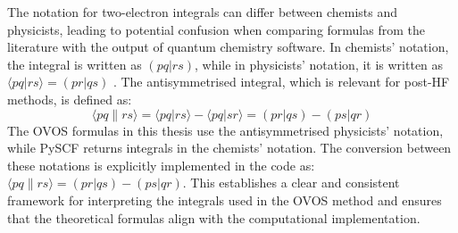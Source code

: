 The notation for two-electron integrals can differ between chemists and physicists, leading to potential confusion when comparing formulas from the literature with the output of quantum chemistry software. In chemists' notation, the integral is written as $(pq|rs)$, while in physicists' notation, it is written as $\langle pq | rs \rangle = (pr|qs)$ \cite{Helgaker2000}. The antisymmetrised integral, which is relevant for post-HF methods, is defined as:
\begin{equation*}
    \langle pq \| rs \rangle = \langle pq | rs \rangle - \langle pq | sr \rangle = (pr|qs) - (ps|qr)
\end{equation*}
The OVOS formulas in this thesis use the antisymmetrised physicists' notation, while PySCF returns integrals in the chemists' notation\cite{Sun2020}. The conversion between these notations is explicitly implemented in the code as: $\langle pq \| rs \rangle = (pr|qs) - (ps|qr)$. This establishes a clear and consistent framework for interpreting the integrals used in the OVOS method and ensures that the theoretical formulas align with the computational implementation.

